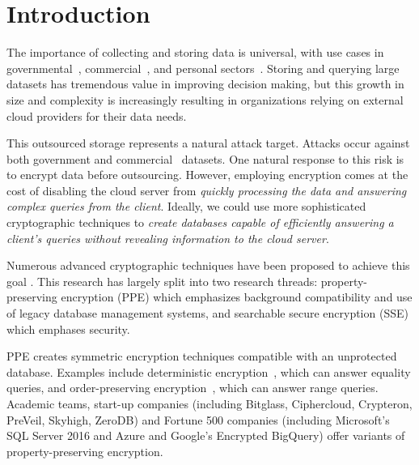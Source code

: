 
\section{Introduction}

The importance of collecting and storing data is universal, with use
cases in governmental~\cite{Powers2014},
commercial~\cite{Linoff:2002:MWT:560274,insightdata}, and personal
sectors~\cite{Mons2011}.
Storing and querying large datasets has tremendous value in improving
decision making, but this growth in size and complexity is increasingly
resulting in organizations relying on external cloud providers for their
data needs.

This outsourced storage represents a natural attack target.  Attacks occur against both government \cite{CyberAttacksOPM} and commercial~\cite{CyberAttacks,gressin2017equifax} datasets.
One natural response to this risk is to encrypt data before outsourcing. 
%
However, employing encryption comes at the cost of disabling the cloud server
from {\em quickly processing the data and answering
complex queries from the client}. 
%
Ideally, we could use more sophisticated cryptographic techniques to {\em create databases
capable of efficiently answering a client's queries without revealing
information to the cloud server}.  


Numerous advanced cryptographic techniques have been proposed to achieve
this goal \cite{EC:PanRou12,CCS:CGKO06,EPRINT:ChoGilNao98,BDOP04}.
This research has largely split into two research threads: 
property-preserving encryption (PPE) which
emphasizes background compatibility and use of legacy database
management systems, and searchable secure encryption (SSE) which emphases security.

PPE creates
symmetric encryption techniques
compatible with an unprotected database. Examples include deterministic
encryption~\cite{C:BelBolONe07}, which can answer equality queries, and
order-preserving encryption~\cite{C:BolCheONe11,EC:BCLO09},
which can answer range queries. Academic teams, start-up companies (including Bitglass, Ciphercloud, Crypteron, PreVeil, Skyhigh, ZeroDB) and Fortune
500 companies (including Microsoft's SQL Server 2016 and Azure and Google's Encrypted BigQuery)  offer variants of property-preserving encryption.


